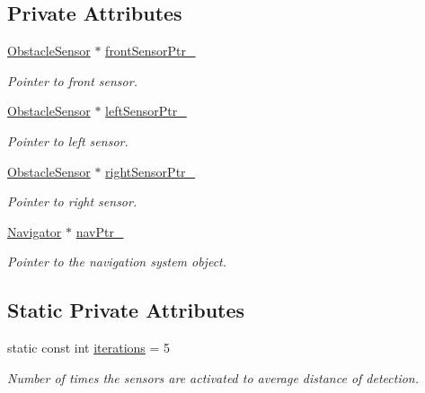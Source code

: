 \subsection*{Private Attributes}
\begin{DoxyCompactItemize}
\item 
\mbox{\hyperlink{class_obstacle_sensor}{Obstacle\+Sensor}} $\ast$ \mbox{\hyperlink{class_obstacle_detection_ab6e8507df02f3b6d9282d0253ac338f3}{front\+Sensor\+Ptr\+\_\+}}
\begin{DoxyCompactList}\small\item\em Pointer to front sensor. \end{DoxyCompactList}\item 
\mbox{\hyperlink{class_obstacle_sensor}{Obstacle\+Sensor}} $\ast$ \mbox{\hyperlink{class_obstacle_detection_a97a24fb4fe1b9d54c2a2bd377426f339}{left\+Sensor\+Ptr\+\_\+}}
\begin{DoxyCompactList}\small\item\em Pointer to left sensor. \end{DoxyCompactList}\item 
\mbox{\hyperlink{class_obstacle_sensor}{Obstacle\+Sensor}} $\ast$ \mbox{\hyperlink{class_obstacle_detection_a25b7aed86ead63e6f71154855cc2d42c}{right\+Sensor\+Ptr\+\_\+}}
\begin{DoxyCompactList}\small\item\em Pointer to right sensor. \end{DoxyCompactList}\item 
\mbox{\hyperlink{class_navigator}{Navigator}} $\ast$ \mbox{\hyperlink{class_obstacle_detection_aa68ee81b360a24f6977480aab44f5650}{nav\+Ptr\+\_\+}}
\begin{DoxyCompactList}\small\item\em Pointer to the navigation system object. \end{DoxyCompactList}\end{DoxyCompactItemize}
\subsection*{Static Private Attributes}
\begin{DoxyCompactItemize}
\item 
static const int \mbox{\hyperlink{class_obstacle_detection_a7d7c77085fa9795bad6de9813046ca12}{iterations}} = 5
\begin{DoxyCompactList}\small\item\em Number of times the sensors are activated to average distance of detection. \end{DoxyCompactList}\end{DoxyCompactItemize}


